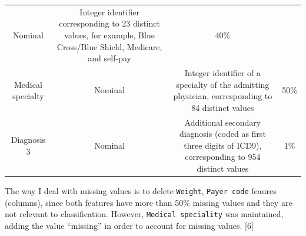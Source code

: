 \documentclass[]{article}
\begin{document}
\begin{longtable}[c]{@{}cccc@{}}
\begin{minipage}[t]{0.09\columnwidth}
Nominal
\strut\end{minipage} &
\begin{minipage}[t]{0.35\columnwidth}\centering\strut
Integer identifier corresponding to 23 distinct values, for example,
Blue Cross/Blue Shield, Medicare, and self-pay
\strut\end{minipage} &
\begin{minipage}[t]{0.24\columnwidth}\centering\strut
40\%
\strut\end{minipage}\tabularnewline
\begin{minipage}[t]{0.20\columnwidth}\centering\strut
Medical specialty
\strut\end{minipage} &
\begin{minipage}[t]{0.09\columnwidth}\centering\strut
Nominal
\strut\end{minipage} &
\begin{minipage}[t]{0.35\columnwidth}\centering\strut
Integer identifier of a specialty of the admitting physician,
corresponding to 84 distinct values
\strut\end{minipage} &
\begin{minipage}[t]{0.24\columnwidth}\centering\strut
50\%
\strut\end{minipage}\tabularnewline
\begin{minipage}[t]{0.20\columnwidth}\centering\strut
Diagnosis 3
\strut\end{minipage} &
\begin{minipage}[t]{0.09\columnwidth}\centering\strut
Nominal
\strut\end{minipage} &
\begin{minipage}[t]{0.35\columnwidth}\centering\strut
Additional secondary diagnosis (coded as first three digits of ICD9),
corresponding to 954 distinct values
\strut\end{minipage} &
\begin{minipage}[t]{0.24\columnwidth}\centering\strut
1\%
\strut\end{minipage}\tabularnewline
\bottomrule
\end{longtable}

The way I deal with missing values is to delete \texttt{Weight},
\texttt{Payer code} feaures (columns), since both features have more
than 50\% missing values and they are not relevant to classification.
However, \texttt{Medical speciality} was maintained, adding the value
``missing'' in order to account for missing values. {[}6{]}
\end{document}
